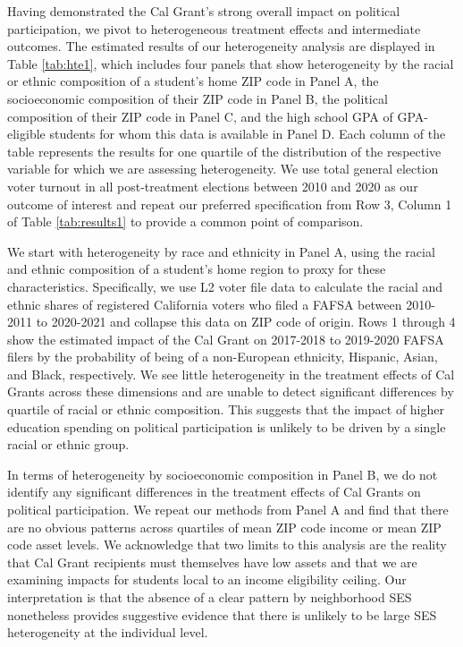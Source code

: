 \documentclass[12pt,letterpaper,oneside]{book}
\begin{document}
Having demonstrated the Cal Grant's strong overall impact on political participation, we pivot to heterogeneous treatment effects and intermediate outcomes. The estimated results of our heterogeneity analysis are displayed in Table \ref{tab:hte1}, which includes four panels that show heterogeneity by the racial or ethnic composition of a student's home ZIP code in Panel A, the socioeconomic composition of their ZIP code in Panel B, the political composition of their ZIP code in Panel C, and the high school GPA of GPA-eligible students for whom this data is available in Panel D. Each column of the table represents the results for one quartile of the distribution of the respective variable for which we are assessing heterogeneity. We use total general election voter turnout in all post-treatment elections between 2010 and 2020 as our outcome of interest and repeat our preferred specification from Row 3, Column 1 of Table \ref{tab:results1} to provide a common point of comparison.

We start with heterogeneity by race and ethnicity in Panel A, using the racial and ethnic composition of a student's home region to proxy for these characteristics. Specifically, we use L2 voter file data to calculate the racial and ethnic shares of registered California voters who filed a FAFSA between 2010-2011 to 2020-2021 and collapse this data on ZIP code of origin. Rows 1 through 4 show the estimated impact of the Cal Grant on 2017-2018 to 2019-2020 FAFSA filers by the probability of being of a non-European ethnicity, Hispanic, Asian, and Black, respectively. We see little heterogeneity in the treatment effects of Cal Grants across these dimensions and are unable to detect significant differences by quartile of racial or ethnic composition. This suggests that the impact of higher education spending on political participation is unlikely to be driven by a single racial or ethnic group.

In terms of heterogeneity by socioeconomic composition in Panel B, we do not identify any significant differences in the treatment effects of Cal Grants on political participation. We repeat our methods from Panel A and find that there are no obvious patterns across quartiles of mean ZIP code income or mean ZIP code asset levels. We acknowledge that two limits to this analysis are the reality that Cal Grant recipients must themselves have low assets and that we are examining impacts for students local to an income eligibility ceiling. Our interpretation is that the absence of a clear pattern by neighborhood SES nonetheless provides suggestive evidence that there is unlikely to be large SES heterogeneity at the individual level.
\end{document}

